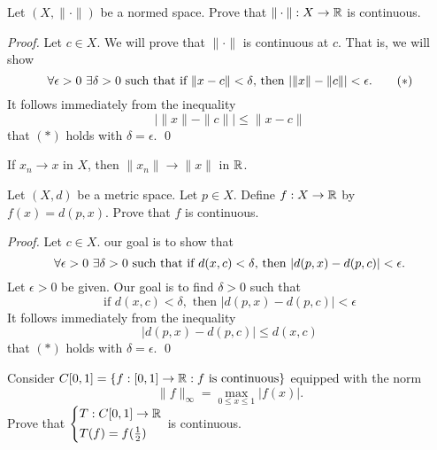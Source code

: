 \begin{example}
    Let $(X, \|\cdot\|)$ be a normed space. Prove that $\|\cdot\|: X \to \mathbb{R}$ is continuous.
\end{example}

\begin{proof}
    Let $c\in X$. We will prove that $\|\cdot\|$ is continuous at $c.$ That is, we will show
    \begin{equation*}
        \forall \epsilon > 0 ~\exists \delta > 0 \text{ such that } \text{if $\|x-c\| < \delta$, then $\left|\|x\| - \|c\|\right| < \epsilon$.}
        \tag{$*$}
    \end{equation*}
    It follows immediately from the inequality
    $$\left|\|x\|-\|c\|\right|\leq \|x-c\|$$
    that $(*)$ holds with $\delta = \epsilon.$ \qed
\end{proof}

\begin{corollary}
    If $x_n \to x$ in $X$, then $\|x_n\| \to \|x\|$ in $\mathbb{R}$.
\end{corollary}

\begin{example}
    Let $(X,d)$ be a metric space. Let $p\in X.$ Define $f: X \to \mathbb{R}$ by $f(x) = d(p,x)$. Prove that $f$ is continuous.
\end{example}

\begin{proof}
    Let $c\in X$. our goal is to show that 
    $$\forall \epsilon > 0 ~\exists \delta > 0 \text{ such that } \text{if $d(x,c) < \delta$, then $|d(p,x) - d(p, c)| < \epsilon.$}$$
    Let $\epsilon > 0$ be given. Our goal is to find $\delta > 0$ such that
    \begin{equation*}
        \text{if $d(x,c) < \delta,$ then $|d(p,x) - d(p,c)| < \epsilon$}
        \tag{$*$}
    \end{equation*}
    It follows immediately from the inequality
    $$|d(p,x) - d(p,c)| \leq d(x,c)$$
    that $(*)$ holds with $\delta = \epsilon.$ \qed
\end{proof}

\begin{example}
    Consider $C[0,1] = \{f:[0,1]\to \mathbb{R}: \text{$f$ is continuous}\}$ equipped with the norm
    $$\|f\|_{\infty} = \max \limits_{0\leq x \leq 1} \left|f(x)\right|.$$
    Prove that $\begin{cases*}
        T: C[0,1] \to \R \\
        T(f) = f(\frac{1}{2})
    \end{cases*}$ is continuous.
\end{example}

